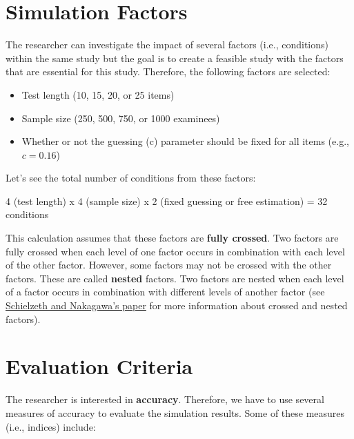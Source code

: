 \documentclass[
]{book}
\providecommand{\tightlist}{%
  \setlength{\itemsep}{0pt}\setlength{\parskip}{0pt}}
\begin{document}
\hypertarget{simulation-factors}{%
\section{Simulation Factors}\label{simulation-factors}}

The researcher can investigate the impact of several factors (i.e., conditions) within the same study but the goal is to create a feasible study with the factors that are essential for this study. Therefore, the following factors are selected:

\begin{itemize}
\tightlist
\item
  Test length (10, 15, 20, or 25 items)
\item
  Sample size (250, 500, 750, or 1000 examinees)
\item
  Whether or not the guessing (c) parameter should be fixed for all items (e.g., \(c = 0.16\))
\end{itemize}

Let's see the total number of conditions from these factors:

4 (test length) x 4 (sample size) x 2 (fixed guessing or free estimation) = 32 conditions

This calculation assumes that these factors are \textbf{fully crossed}. Two factors are fully crossed when each level of one factor occurs in combination with each level of the other factor. However, some factors may not be crossed with the other factors. These are called \textbf{nested} factors. Two factors are nested when each level of a factor occurs in combination with different levels of another factor (see \href{https://besjournals.onlinelibrary.wiley.com/doi/full/10.1111/j.2041-210x.2012.00251.x}{Schielzeth and Nakagawa's paper} for more information about crossed and nested factors).

\hypertarget{evaluation-criteria}{%
\section{Evaluation Criteria}\label{evaluation-criteria}}

The researcher is interested in \textbf{accuracy}. Therefore, we have to use several measures of accuracy to evaluate the simulation results. Some of these measures (i.e., indices) include:
\end{document}
